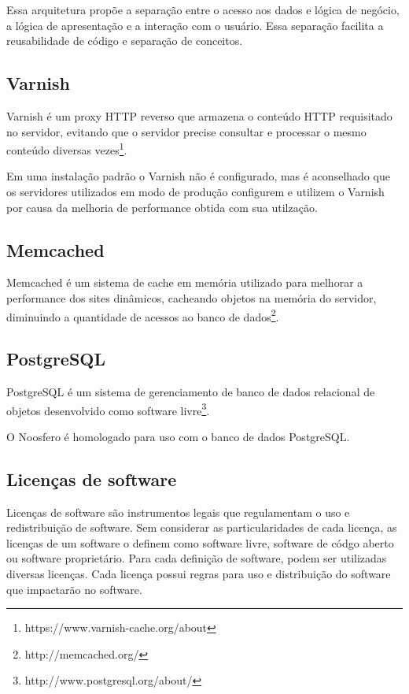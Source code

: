 \documentclass[[a4paper,11pt]{article}
\begin{document}
Essa arquitetura propõe a separação entre o acesso aos dados e lógica de
negócio, a lógica de apresentação e a interação com o usuário. Essa
separação facilita a reusabilidade de código e separação de conceitos.

\subsection{Varnish}

Varnish é um proxy HTTP reverso que armazena o conteúdo HTTP requisitado
no servidor, evitando que o servidor precise consultar e processar o
mesmo conteúdo diversas
vezes\footnote{https://www.varnish-cache.org/about}.

Em uma instalação padrão o Varnish não é configurado, mas é aconselhado
que os servidores utilizados em modo de produção configurem e utilizem o
Varnish por causa da melhoria de performance obtida com sua utilzação.

\subsection{Memcached}

Memcached é um sistema de cache em memória utilizado para melhorar
a performance dos sites dinâmicos, cacheando objetos na memória do
servidor, diminuindo a quantidade de acessos ao banco de
dados\footnote{http://memcached.org/}.

\subsection{PostgreSQL}

PostgreSQL é um sistema de gerenciamento de banco de dados relacional de
objetos desenvolvido como software
livre\footnote{http://www.postgresql.org/about/}.

O Noosfero é homologado para uso com o banco de dados PostgreSQL.

\subsection{Licenças de software}

Licenças de software são instrumentos legais que regulamentam o uso e
redistribuição de software. Sem considerar as particularidades de cada
licença, as licenças de um software o definem como software livre,
software de códgo aberto ou software proprietário.
Para cada definição de software, podem ser utilizadas diversas licenças.
Cada licença possui regras para uso e distribuição do software que
impactarão no software.
\end{document}
